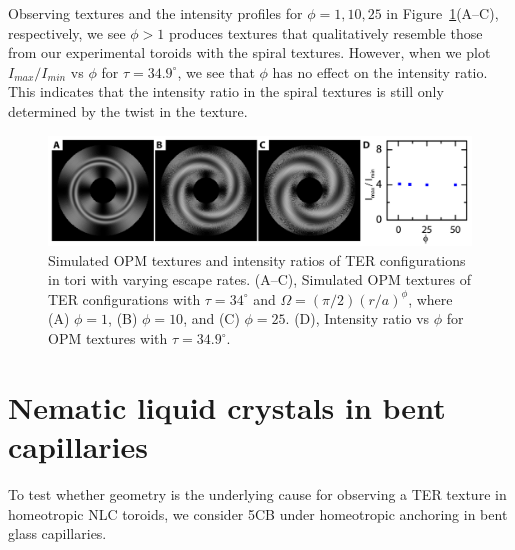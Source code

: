 Observing textures and the intensity profiles for $\phi = 1,10,25$ in Figure~\ref{f:4-I0I45vsEscape}(A--C), respectively, we see $\phi > 1$ produces textures that qualitatively resemble those from our experimental toroids with the spiral textures.
However, when we plot $I_{max}/I_{min}$ vs $\phi$ for $\tau = 34.9^{\circ}$, we see that $\phi$ has no effect on the intensity ratio.
This indicates that the intensity ratio in the spiral textures is still only determined by the twist in the texture.
\begin{figure}
  \centering
  \includegraphics{figures/C4/Ch4-Figs_I0I45vsEscape.png}
  \caption{Simulated OPM textures and intensity ratios of TER configurations in tori with varying escape rates.
  (A--C), Simulated OPM textures of TER configurations with $\tau = 34^\circ$ and $\Omega = (\pi/2)(r/a)^{\phi}$, where (A) $\phi = 1$, (B) $\phi = 10$, and (C) $\phi = 25$.
  (D), Intensity ratio vs $\phi$ for OPM textures with $\tau = 34.9^\circ$.}\label{f:4-I0I45vsEscape}
\end{figure}

\section{Nematic liquid crystals in bent capillaries}
To test whether geometry is the underlying cause for observing a TER texture in homeotropic NLC toroids, we consider 5CB under homeotropic anchoring in bent glass capillaries.


